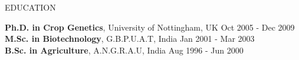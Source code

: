 \documentclass{resume} %
\begin{document}

\begin{rSection}{EDUCATION}

{\textbf{Ph.D. in Crop Genetics}, University of Nottingham, UK} \hfill {Oct 2005 - Dec 2009}
\\
{\textbf{M.Sc. in Biotechnology}, G.B.P.U.A.T, India} \hfill {Jan 2001 - Mar 2003}
\\
{\textbf{B.Sc. in Agriculture}, A.N.G.R.A.U, India} \hfill {Aug 1996 - Jun 2000}

\end{rSection} 

\end{document}
